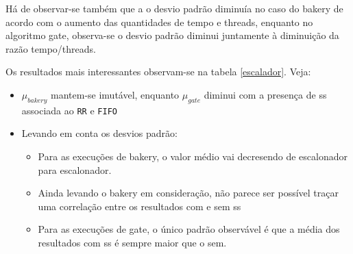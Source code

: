 \documentclass[12pt]{article}
\begin{document}
Há de observar-se também que a o desvio padrão diminuía no caso do bakery de acordo com o aumento das quantidades de tempo e threads, enquanto no algoritmo gate, observa-se o desvio padrão diminui juntamente à diminuição da razão tempo/threads.

Os resultados mais interessantes observam-se na tabela \ref{escalador}. Veja: \begin{itemize}
\item $\mu_{bakery}$ mantem-se imutável, enquanto $\mu_{gate}$ diminui com a presença de ss associada ao \texttt{RR} e \texttt{FIFO}
\item Levando em conta os desvios padrão: \begin{itemize}
\item Para as execuções de bakery, o valor médio vai decresendo de escalonador para escalonador.
\item Ainda levando o bakery em consideração, não parece ser possível traçar uma correlação entre os resultados com e sem ss
\item Para as execuções de gate, o único padrão observável é que a média dos resultados com ss é sempre maior que o sem.
\end{itemize}
\end{itemize}
\end{document}
